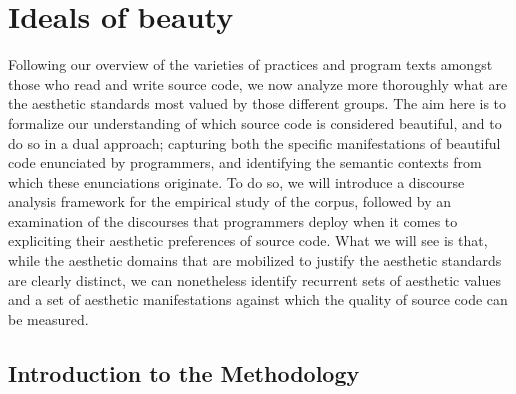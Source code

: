 \section{Ideals of beauty}
\label{sec:ideals-beauty}

Following our overview of the varieties of practices and program texts amongst those who read and write source code, we now analyze more thoroughly what are the aesthetic standards most valued by those different groups. The aim here is to formalize our understanding of which source code is considered beautiful, and to do so in a dual approach; capturing both the specific manifestations of beautiful code enunciated by programmers, and identifying the semantic contexts from which these enunciations originate. To do so, we will introduce a discourse analysis framework for the empirical study of the corpus, followed by an examination of the discourses that programmers deploy when it comes to expliciting their aesthetic preferences of source code. What we will see is that, while the aesthetic domains that are mobilized to justify the aesthetic standards are clearly distinct, we can nonetheless identify recurrent sets of aesthetic values and a set of aesthetic manifestations against which the quality of source code can be measured.

\subsection{Introduction to the Methodology}
\label{subsec:ideals-methodology}

